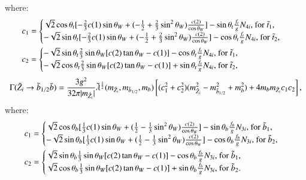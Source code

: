 \documentclass[final,3p,times]{elsarticle}
\begin{document}
where:
\begin{align}
c_{1} &= \begin{cases}
		\sqrt{2}\cos\theta_t[-{2 \over 3}c(1) \sin\theta_W + (-{1 \over 2} + {2 \over 3}\sin^2 \theta_W){c(2) \over \cos\theta_W}] - \sin\theta_t {f_{t} \over g} N_{4i} $, for $\tilde{t}_1$,$ \\
		-\sqrt{2}\sin\theta_t[-{2 \over 3}c(1) \sin\theta_W + (-{1 \over 2} + {2 \over 3}\sin^2 \theta_W){c(2) \over \cos\theta_W}] - \cos\theta_t {f_{t} \over g}N_{4i} $, for $\tilde{t}_2$,$ \\
		\end{cases} \\
c_{2} &= \begin{cases}
		-\sqrt{2}\sin\theta_t{2 \over 3}\sin\theta_W [c(2)\tan\theta_W - c(1)] - \cos\theta_t {f_{t} \over g} N_{4i} $, for $\tilde{t}_1$,$ \\
		-\sqrt{2}\cos\theta_t{2 \over 3}\sin\theta_W [c(2)\tan\theta_W - c(1)] + \sin\theta_t {f_{t} \over g} N_{4i} $, for $\tilde{t}_2$,$ \\
		\end{cases}
\end{align}
\begin{equation} \label{neutsbbNMSSM}
\Gamma(\tilde{Z}_i \rightarrow \tilde{b}_{1/2} \bar{b}) = {3 g^2 \over 32\pi |m_{\tilde{Z}_i}|} \tilde{\lambda}^{1 \over 2}(m_{\tilde{Z}_i},m_{\tilde{b}_{1/2}}, m_{b})\left[(c_{1}^2 + c_{2}^2)(m_{\tilde{Z}_i}^2 - m_{\tilde{b}_{1/2}}^2 + m_{b}^2) + 4m_{b}m_{\tilde{Z}_i}c_{1}c_{2}\right],
\end{equation}
where:
\begin{align}
c_{1} &= \begin{cases}
		\sqrt{2}\cos\theta_b [{1 \over 3}c(1) \sin\theta_W + ({1 \over 2} - {1 \over 3}\sin^2 \theta_W){c(2) \over \cos\theta_W}] - \sin\theta_b {f_{b} \over g} N_{3i} $, for $\tilde{b}_1$,$ \\
		-\sqrt{2}\sin\theta_b[{1 \over 3}c(1) \sin\theta_W + ({1 \over 2} - {1 \over 3}\sin^2 \theta_W){c(2) \over \cos\theta_W}] - \cos\theta_b {f_{b} \over g}N_{3i} $, for $\tilde{b}_2$,$ \\
		\end{cases} \\
c_{2} &= \begin{cases}
		\sqrt{2}\sin\theta_b{1 \over 3}\sin\theta_W [c(2)\tan\theta_W - c(1)] - \cos\theta_b {f_{b} \over g} N_{3i} $, for $\tilde{b}_1$,$ \\
		\sqrt{2}\cos\theta_b{1 \over 3}\sin\theta_W [c(2)\tan\theta_W - c(1)] + \sin\theta_b {f_{b} \over g} N_{3i} $, for $\tilde{b}_2. \\
		\end{cases}
\end{align}
\end{document}
